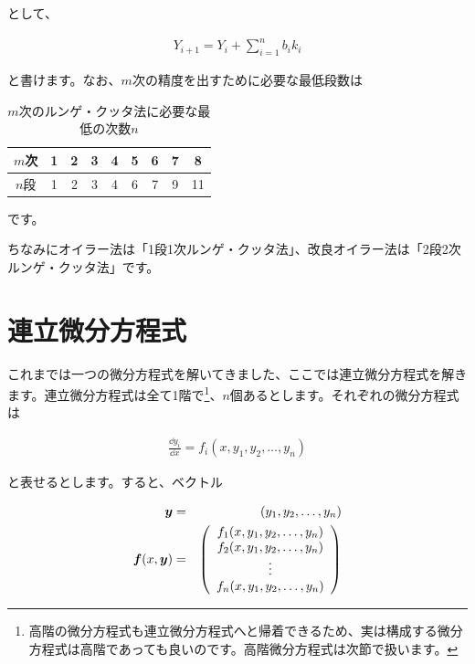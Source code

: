 \noindent
として、

\begin{eqnarray}
    Y_{i+1}=Y_i+\sum_{i=1}^n b_i k_i
\end{eqnarray}

\noindent
と書けます。なお、$m$次の精度を出すために必要な最低段数は

\begin{table}[htb]
\begin{center}
  \caption{$m$次のルンゲ・クッタ法に必要な最低の次数$n$}
  \begin{tabular}{c|cccccccc}
    $m$次 & 1 & 2 & 3 & 4 & 5 & 6 & 7 & 8 \\
    \hline
    $n$段 & 1 & 2 & 3 & 4 & 6 & 7 & 9 & 11 \\
  \end{tabular}
  \end{center}
\end{table}

\noindent
です。

ちなみにオイラー法は「1段1次ルンゲ・クッタ法」、改良オイラー法は「2段2次ルンゲ・クッタ法」です。









\section{連立微分方程式}
\label{numerical-multiple}
これまでは一つの微分方程式を解いてきました、ここでは連立微分方程式を解きます。連立微分方程式は全て1階で\footnote{高階の微分方程式も連立微分方程式へと帰着できるため、実は構成する微分方程式は高階であっても良いのです。高階微分方程式は次節で扱います。}、$n$個あるとします。それぞれの微分方程式は

\begin{eqnarray}
    \frac{\dd y_i}{\dd x}=f_i(x,y_1,y_2,\dots,y_n)
\end{eqnarray}

\noindent
と表せるとします。すると、ベクトル

\begin{eqnarray}
    \boldsymbol{y}&=&(y_1,y_2,\dots,y_n) \\
    \boldsymbol{f}(x,\boldsymbol{y})&=&\pqty{
    \begin{array}{c}
        f_1(x,y_1,y_2,\dots,y_n) \\
        f_2(x,y_1,y_2,\dots,y_n) \\
        \vdots \\
        f_n(x,y_1,y_2,\dots,y_n)
    \end{array}
    }
\end{eqnarray}

